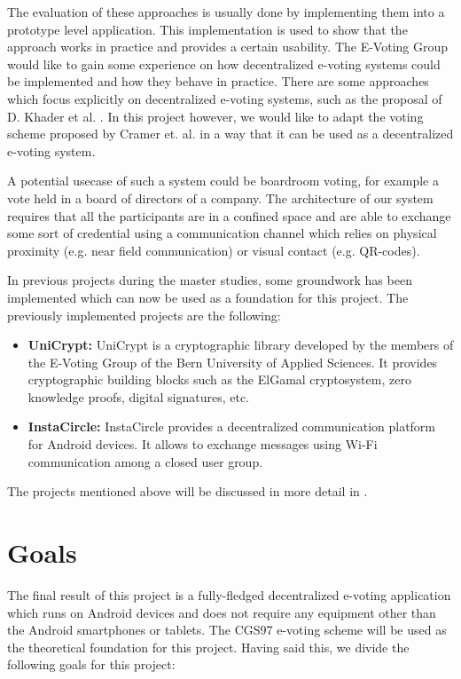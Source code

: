 \documentclass[numbers=noenddot, abstract=on, a4paper, headsepline,
footsepline, oneside, draft=off]{scrreprt}
\begin{document}
The evaluation of these approaches is usually done by implementing them into a
prototype level application. This implementation is used to show that the
approach works in practice and provides a certain usability. The E-Voting Group
would like to gain some experience on how decentralized e-voting systems could
be implemented and how they behave in practice. There are some approaches which
focus explicitly on decentralized e-voting systems, such as the proposal of
D. Khader et al. \cite{HKRS12}. In this project however, we would like to adapt
the voting scheme proposed by Cramer et. al. \cite{CGS97} in a way that it can be
used as a decentralized e-voting system.

A potential usecase of such a system could be boardroom voting, for example a
vote held in a board of directors of a company. The architecture of our system
requires that all the participants are in a confined space and are able to
exchange some sort of credential using a communication channel which relies on
physical proximity (e.g. near field communication) or visual contact (e.g.
QR-codes).

In previous projects during the master studies, some groundwork has been
implemented which can now be used as a foundation for this project. The
previously implemented projects are the following:
\begin{itemize}
  \item \textbf{UniCrypt:} UniCrypt is a cryptographic library developed by the
  members of the E-Voting Group of the Bern University of Applied Sciences. It
  provides cryptographic building blocks such as the ElGamal cryptosystem, zero
  knowledge proofs, digital signatures, etc. 
  \item \textbf{InstaCircle: } InstaCircle provides a decentralized
  communication platform for Android devices. It allows to exchange messages
  using Wi-Fi communication among a closed user group.
\end{itemize}
The projects mentioned above will be discussed in more detail in .

\section{Goals}
\label{cha:goals}
The final result of this project is a fully-fledged decentralized e-voting
application which runs on Android devices and does not require any equipment
other than the Android smartphones or tablets. The CGS97 e-voting
scheme \cite{CGS97} will be used as the theoretical foundation for this project.
Having said this, we divide the following goals for this project:
\end{document}
